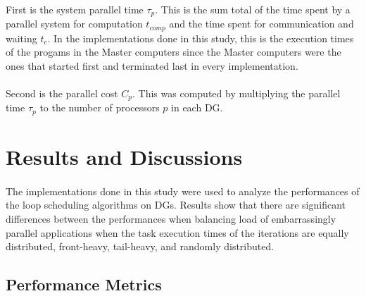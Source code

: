 \documentclass[10pt, twocolumn, letterpaper]{article}
\begin{document}
\paragraph{}
First is the system parallel time $\tau_p$. This is the sum total of the time spent by a parallel system for computation $t_{comp}$ and the time spent for communication and waiting $t_c$. In the implementations done in this study, this is the execution times of the progams in the Master computers since the Master computers were the ones that started first and terminated last in every implementation.

\paragraph{}
Second is the parallel cost $C_p$. This was computed by multiplying the parallel time $\tau_p$ to the number of processors $p$ in each DG\cite{pabico}.

\section{Results and Discussions}

\paragraph{}
The implementations done in this study were used to analyze the performances of the loop scheduling algorithms on DGs. Results show that there are significant differences between the performances when balancing load of embarrassingly parallel applications when the task execution times of the iterations are equally distributed, front-heavy, tail-heavy, and randomly distributed.

\subsection{Performance Metrics}
\end{document}
